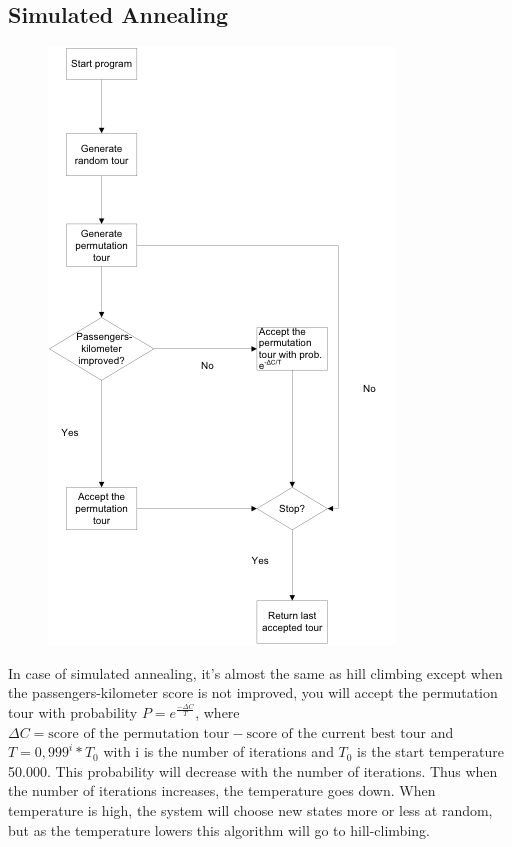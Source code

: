\documentclass[a4paper]{article}
\begin{document}
\subsection{Simulated Annealing}
\begin{figure}[H]
    \includegraphics[scale=0.6]{sa_chart.png}
\end{figure}
In case of simulated annealing, it's almost the same as hill climbing except when the passengers-kilometer score is not improved, you will accept the permutation tour with probability $P=e^{\frac{-\Delta C}{T}}$, where $\Delta C= \text{score of the permutation tour}-\text{score of the current best tour}$ and $T=0,999^i*T_0$ with i is the number of iterations and $T_0$  is the start temperature 50.000.
This probability will decrease with the number of iterations. Thus when the number of iterations increases, the temperature goes down. When temperature is high, the system will choose new states more or less at random, but as the temperature lowers this algorithm will go to hill-climbing. 
\end{document}
